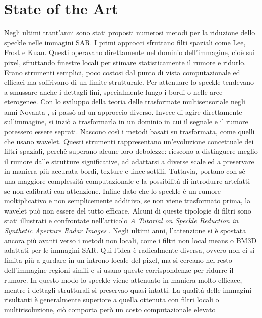 
\chapter{State of the Art}
Negli ultimi trant'anni sono stati proposti numerosi metodi per la riduzione dello speckle nelle immagini SAR.
 I primi approcci sfruttano filti spaziali come Lee, Frost e Kuan.
Questi operavano direttamente nel dominio dell'immagine, cioè sui pixel, sfruttando finestre locali per stimare
 statisticamente il rumore e ridurlo. Erano strumenti semplici, poco costosi dal punto 
di vista computazionale ed efficaci ma soffrivano di un limite strutturale. Per attenuare lo speckle tendevano a 
smussare anche i dettagli fini, specialmente lungo i bordi o nelle aree eterogenee. 
Con lo sviluppo della teoria delle trasformate multisensoriale negli anni Novanta , si passò ad un approccio diverso. 
Invece di agire direttamente sul'immagine, si inziò a trasformarla in un dominio 
in cui il segnale e il rumore potessero essere seprati. Nascono così i metodi basati su trasformata, come quelli che 
usano wavelet. Questi strumenti rappresentano un'evoluzione concettuale dei filtri spaziali,
perchè superano alcune loro debolezze: riescono a distinguere meglio il rumore dalle strutture significative, ad 
adattarsi a diverse scale ed a preservare in maniera più accurata bordi, texture e linee sottili. 
Tuttavia, portano con sè una maggiore complessità computazionale e la possibilità di introdurre artefatti se non 
calibrati con attenzione. Infine dato che lo speckle è un rumore moltiplicativo e non semplicemente 
additivo, se non viene trasformato prima, la wavelet può non essere del tutto efficace. 
Alcuni di queste tipologie di filtri sono stati illustrati e confrontate nell'articolo \textit{A Tutorial on Speckle
Reduction in Synthetic Aperture Radar Images}  \cite{tutorSpeckle}.
Negli ultimi anni, l'attenzione si è spostata ancora più avanti verso i metodi non locali, come i filtri non local means o 
BM3D adattati per le immagini SAR. Qui l'idea è radicalmente diversa, ovvero non ci si limita più a gurdare in un 
introno locale del pixel, ma si cercano nel resto dell'immagine regioni simili e si usano queste 
corrispondenze per ridurre il rumore. In questo modo lo speckle viene attenuato in maniera molto efficace, mentre 
i dettagli strutturali si preservao quasi intatti. La qualità delle immagini risultanti è generalmente
superiore a quella ottenuta con filtri locali o multirisoluzione, ciò comporta però un costo computazionale elevato 
